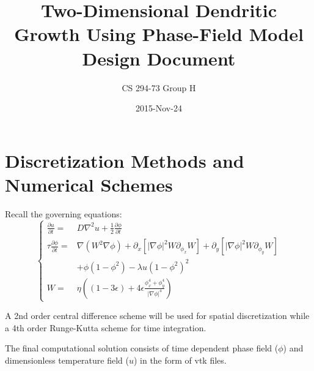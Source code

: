 \documentclass{article}
\title{Two-Dimensional Dendritic Growth Using Phase-Field Model \\ Design Document}
\date{2015-Nov-24}
\author{CS 294-73 Group H}
\begin{document}
\maketitle
    
\section{Discretization Methods and Numerical Schemes}
Recall the governing equations:
\begin{equation}
\begin{cases}
\frac{\partial u}{\partial t} =&D\nabla^2u+\frac{1}{2}\frac{\partial\phi}{\partial t} \\
\tau\frac{\partial \phi}{\partial t} =&\nabla(W^2\nabla\phi)+\partial_x[|\nabla\phi|^2W\partial_{\phi_x}W]+\partial_y[|\nabla\phi|^2W\partial_{\phi_y}W] \\
&+\phi(1-\phi^2)-\lambda u(1-\phi^2)^2 \\
W=&\eta((1-3\epsilon)+4\epsilon\frac{\phi_x^4+\phi_y^4}{|\nabla\phi|^4})
\end{cases}
\end{equation}

A 2nd order central difference scheme will be used for spatial discretization while a 4th order Runge-Kutta scheme for time integration. 

The final computational solution consists of time dependent phase field ($\phi$) and dimensionless temperature field ($u$) in the form of vtk files.
\end{document}
